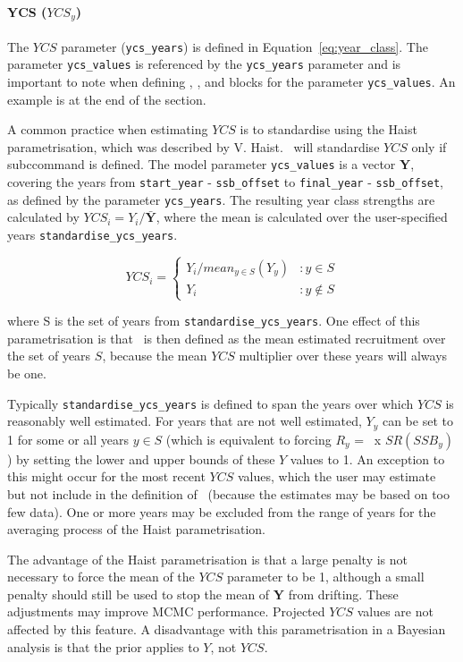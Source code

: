 \paragraph*{YCS ($YCS_y$)}

The $YCS$ parameter (\texttt{ycs\_years}) is defined in Equation~\eqref{eq:year_class}. The parameter \texttt{ycs\_values} is referenced by the \texttt{ycs\_years} parameter and is important to note when defining , , and  blocks for the parameter \texttt{ycs\_values}. An example is at the end of the section.

A common practice when estimating $YCS$ is to standardise using the Haist parametrisation, which was described by V. Haist. \CNAME~will standardise $YCS$ only if subccommand  is defined. The model parameter \texttt{ycs\_values} is a vector \textbf{Y}, covering the years from \texttt{start\_year} - \texttt{ssb\_offset} to \texttt{final\_year} - \texttt{ssb\_offset}, as defined by the parameter \texttt{ycs\_years}. The resulting year class strengths are calculated by $YCS_i=Y_i/\bar{\textbf{Y}}$, where the mean is calculated over the user-specified years \texttt{standardise\_ycs\_years}.

\[
YCS_i =
\begin{cases}
Y_i / mean_{y \in S}(Y_y) & :y \in S\\
Y_i					 & :y \notin S
\end{cases}
\]

where S is the set of years from \texttt{standardise\_ycs\_years}. One effect of this parametrisation is that \Rzero\ is then defined as the mean estimated recruitment over the set of years $S$, because the mean $YCS$ multiplier over these years will always be one.

Typically \texttt{standardise\_ycs\_years} is defined to span the years over which $YCS$ is reasonably well estimated. For years that are not well estimated, $Y_y$ can be set to 1 for some or all years $y\in S$ (which is equivalent to forcing $R_y$ = \Rzero\ x $SR(SSB_y)$) by setting the lower and upper bounds of these $Y$ values to 1. An exception to this might occur for the most recent $YCS$ values, which the user may estimate but not include in the definition of \Rzero\ (because the estimates may be based on too few data). One or more years may be excluded from the range of years for the averaging process of the Haist parametrisation.

The advantage of the Haist parametrisation is that a large penalty is not necessary to force the mean of the $YCS$ parameter to be 1, although a small penalty should still be used to stop the mean of \textbf{Y} from drifting. These adjustments may improve MCMC performance. Projected $YCS$ values are not affected by this feature. A disadvantage with this parametrisation in a Bayesian analysis is that the prior applies to $Y$, not $YCS$.


